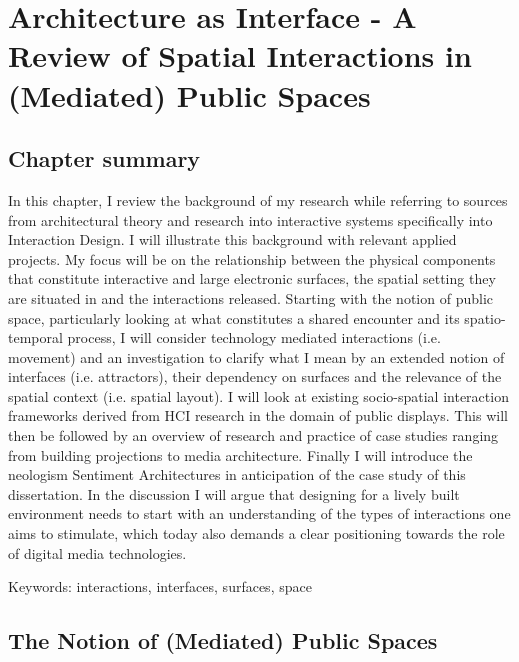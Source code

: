 \chapter{Architecture as Interface - A Review of Spatial Interactions in (Mediated) Public Spaces}
\label{chapterlabel3}


\section*{Chapter summary}

In this chapter, I review the background of my research while referring to sources from architectural theory and research into interactive systems specifically into Interaction Design. I will illustrate this background with relevant applied projects. My focus will be on the relationship between the physical components that constitute interactive and large electronic surfaces, the spatial setting they are situated in and the interactions released. Starting with the notion of public space, particularly looking at what constitutes a shared encounter and its spatio-temporal process, I will consider technology mediated interactions (i.e. movement) and an investigation to clarify what I mean by an extended notion of interfaces (i.e. attractors), their dependency on surfaces and the relevance of the spatial context (i.e. spatial layout). I will look at existing socio-spatial interaction frameworks derived from HCI research in the domain of public displays. This will then be followed by an overview of research and practice of case studies ranging from building projections to media architecture. Finally I will introduce the neologism Sentiment Architectures in anticipation of the case study of this dissertation. In the discussion I will argue that designing for a lively built environment needs to start with an understanding of the types of interactions one aims to stimulate, which today also demands a clear positioning towards the role of digital media technologies.  

Keywords: interactions, interfaces, surfaces, space

\newpage




\section{The Notion of (Mediated) Public Spaces}

